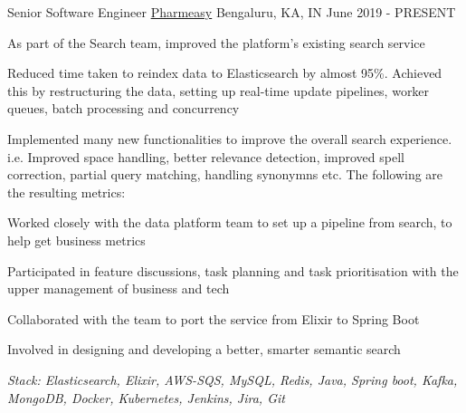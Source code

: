 
\begin{cventries}
    \cventry
    {Senior Software Engineer} %
    {\href{https://www.pharmeasy.in}{Pharmeasy\acvHeaderIconSep\faExternalLink}} %
    {Bengaluru, KA, IN} %
    {June 2019 - PRESENT} %
    {
        \begin{cvitems} %
            \item {As part of the Search team, improved the platform's existing search service}
            \item {Reduced time taken to reindex data to Elasticsearch by almost 95\%. Achieved this by restructuring the data, setting up real-time update pipelines, worker queues, batch processing and concurrency}
            \item {Implemented many new functionalities to improve the overall search experience. i.e. Improved space handling, better relevance detection, improved spell correction, partial query matching, handling synonymns etc. The following are the resulting metrics:}
            \item {Worked closely with the data platform team to set up a pipeline from search, to help get business metrics}
            \item {Participated in feature discussions, task planning and task prioritisation with the upper management of business and tech}
            \item {Collaborated with the team to port the service from Elixir to Spring Boot}
            \item {Involved in designing and developing a better, smarter semantic search}
            \item \textit{Stack: Elasticsearch, Elixir, AWS-SQS, MySQL, Redis, Java, Spring boot, Kafka, MongoDB, Docker, Kubernetes, Jenkins, Jira, Git}
        \end{cvitems}
    }


\end{cventries}
